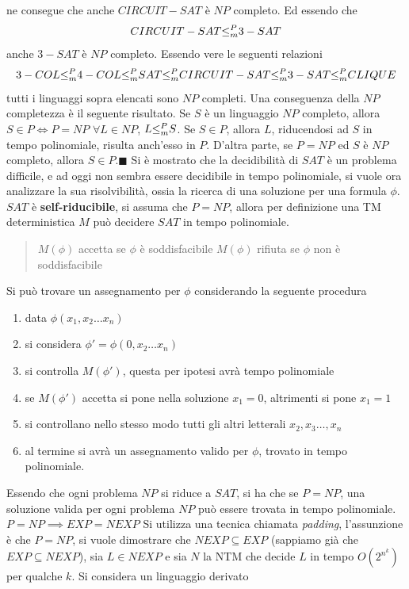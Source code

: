 \documentclass[10pt, letterpaper]{report}
\begin{document}
ne consegue che anche $CIRCUIT-SAT$ è $NP$ completo. Ed essendo che 
$$CIRCUIT-SAT{\le_m^P} 3-SAT$$
anche $3-SAT$ è $NP$ completo. Essendo vere le seguenti relazioni 
$$ 
3-COL {\le_m^P} 4-COL {\le_m^P} SAT {\le_m^P} CIRCUIT-SAT {\le_m^P} 3-SAT {\le_m^P} CLIQUE
$$
tutti i linguaggi sopra elencati sono $NP$ completi.\acc 
Una conseguenza della $NP$ completezza è il seguente risultato.\acc 
\teo{} Se $S$ è un linguaggio $NP$ completo, allora $S\in P \iff P=NP$\acc 
\dimo{} $\forall L \in NP$, $L{\le_m^P} S$. Se $S\in P$, allora $L$, riducendosi ad $S$ in tempo polinomiale, risulta anch'esso in $P$. D'altra parte, se $P=NP$ ed $S$ è $NP$ completo, allora $S\in P$.\hfill$\blacksquare$\acc   
Si è mostrato che la decidibilità di $SAT$ è un problema difficile, e ad oggi non sembra essere decidibile in tempo polinomiale, si vuole ora analizzare la sua risolvibilità, ossia la ricerca di una soluzione per una formula $\phi$.\acc 
$SAT$ è \textbf{self-riducibile}, si assuma che $P=NP$, allora per definizione una TM deterministica $M$ può decidere $SAT$ in tempo polinomiale. \begin{quote}
    $M(\phi)$ accetta se $\phi$ è soddisfacibile
    $M(\phi)$ rifiuta se $\phi$ non è soddisfacibile
\end{quote}
Si può trovare un assegnamento per $\phi$ considerando la seguente procedura \begin{enumerate}
    \item data $\phi(x_1,x_2\dots x_n)$
    \item si considera $\phi'=\phi(0,x_2\dots x_n)$
    \item si controlla $M(\phi')$, questa per ipotesi avrà tempo polinomiale 
    \item se $M(\phi')$ accetta si pone nella soluzione $x_1=0$, altrimenti si pone $x_1=1$
    \item si controllano nello stesso modo tutti gli altri letterali $x_2,x_3\dots ,x_n$
    \item al termine si avrà un assegnamento valido per $\phi$, trovato in tempo polinomiale.
\end{enumerate}
Essendo che ogni problema $NP$ si riduce a $SAT$, si ha che se $P=NP$, una soluzione valida per ogni problema $NP$ può essere trovata in tempo polinomiale.\acc 
\teo{} $P=NP\implies EXP=NEXP$\acc 
\dimo{} Si utilizza una tecnica chiamata \textit{padding}, l'assunzione è che $P=NP$, si vuole dimostrare che $NEXP\subseteq EXP$ (sappiamo già che $EXP \subseteq NEXP$), sia $L\in NEXP$ e sia $N$ la NTM che decide $L$ in tempo $O(2^{n^k})$ per qualche $k$.\acc 
Si considera un linguaggio derivato
\end{document}
